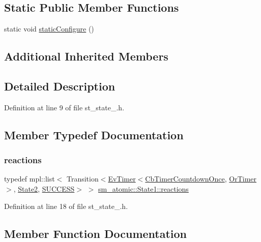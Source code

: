 \subsection*{Static Public Member Functions}
\begin{DoxyCompactItemize}
\item 
static void \hyperlink{structsm__atomic_1_1State1_a299adfad0ff1e2c592c319e1fa5de114}{static\+Configure} ()
\end{DoxyCompactItemize}
\subsection*{Additional Inherited Members}


\subsection{Detailed Description}


Definition at line 9 of file st\+\_\+state\+\_.\+h.



\subsection{Member Typedef Documentation}
\mbox{\label{structsm__atomic_1_1State1_ab05a524c2d0d99c2ca7c4174d49de73c}} 
\subsubsection{\texorpdfstring{reactions}{reactions}}
{\footnotesize\ttfamily typedef mpl\+::list$<$ Transition$<$\hyperlink{structros__timer__client_1_1EvTimer}{Ev\+Timer}$<$\hyperlink{classros__timer__client_1_1CbTimerCountdownOnce}{Cb\+Timer\+Countdown\+Once}, \hyperlink{classsm__atomic_1_1OrTimer}{Or\+Timer}$>$, \hyperlink{structsm__atomic_1_1State2}{State2}, \hyperlink{structsmacc_1_1default__transition__tags_1_1SUCCESS}{S\+U\+C\+C\+E\+SS}$>$ $>$ \hyperlink{structsm__atomic_1_1State1_ab05a524c2d0d99c2ca7c4174d49de73c}{sm\+\_\+atomic\+::\+State1\+::reactions}}



Definition at line 18 of file st\+\_\+state\+\_.\+h.



\subsection{Member Function Documentation}
\mbox{\label{structsm__atomic_1_1State1_a9d2c943f02a8e0f1d7b86132ada1c6e0}} 
